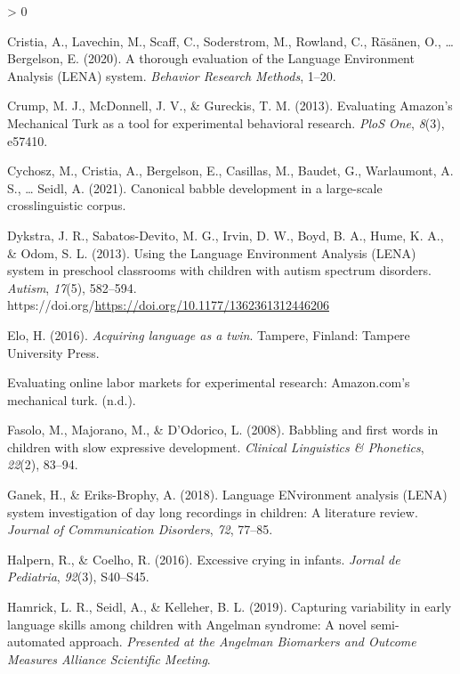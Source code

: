 \documentclass[
  english,
  ,man]{apa6}
\newlength{\cslhangindent}
\newenvironment{CSLReferences}[2] %
 {%
  \setlength{\parindent}{0pt}
  \ifodd #1 \everypar{\setlength{\hangindent}{\cslhangindent}}\ignorespaces\fi
  \ifnum #2 > 0
  \setlength{\parskip}{#2\baselineskip}
  \fi
 }%
 {}
\begin{document}
\begin{CSLReferences}{1}{0}
\leavevmode\hypertarget{ref-cristia2020thorough}{}%
Cristia, A., Lavechin, M., Scaff, C., Soderstrom, M., Rowland, C., Räsänen, O., \ldots{} Bergelson, E. (2020). A thorough evaluation of the {Language Environment Analysis (LENA)} system. \emph{Behavior Research Methods}, 1--20.

\leavevmode\hypertarget{ref-crump2013evaluating}{}%
Crump, M. J., McDonnell, J. V., \& Gureckis, T. M. (2013). Evaluating{ Amazon's Mechanical Turk} as a tool for experimental behavioral research. \emph{PloS One}, \emph{8}(3), e57410.

\leavevmode\hypertarget{ref-cychosz2021canonical}{}%
Cychosz, M., Cristia, A., Bergelson, E., Casillas, M., Baudet, G., Warlaumont, A. S., \ldots{} Seidl, A. (2021). Canonical babble development in a large-scale crosslinguistic corpus.

\leavevmode\hypertarget{ref-Dykstra2013}{}%
Dykstra, J. R., Sabatos-Devito, M. G., Irvin, D. W., Boyd, B. A., Hume, K. A., \& Odom, S. L. (2013). {Using the Language Environment Analysis (LENA) system in preschool classrooms with children with autism spectrum disorders}. \emph{Autism}, \emph{17}(5), 582--594. https://doi.org/\url{https://doi.org/10.1177/1362361312446206}

\leavevmode\hypertarget{ref-Elo}{}%
Elo, H. (2016). \emph{{Acquiring language as a twin}}. Tampere, Finland: Tampere University Press.

\leavevmode\hypertarget{ref-berinsky2012evaluating}{}%
Evaluating online labor markets for experimental research: Amazon.com's mechanical turk. (n.d.).

\leavevmode\hypertarget{ref-fasolo2008babbling}{}%
Fasolo, M., Majorano, M., \& D'Odorico, L. (2008). Babbling and first words in children with slow expressive development. \emph{Clinical Linguistics \& Phonetics}, \emph{22}(2), 83--94.

\leavevmode\hypertarget{ref-ganek2018language}{}%
Ganek, H., \& Eriks-Brophy, A. (2018). {Language ENvironment analysis (LENA)} system investigation of day long recordings in children: A literature review. \emph{Journal of Communication Disorders}, \emph{72}, 77--85.

\leavevmode\hypertarget{ref-halpern2016excessive}{}%
Halpern, R., \& Coelho, R. (2016). Excessive crying in infants. \emph{Jornal de Pediatria}, \emph{92}(3), S40--S45.

\leavevmode\hypertarget{ref-hamrick2019capturing}{}%
Hamrick, L. R., Seidl, A., \& Kelleher, B. L. (2019). Capturing variability in early language skills among children with {A}ngelman syndrome: A novel semi-automated approach. \emph{Presented at the Angelman Biomarkers and Outcome Measures Alliance Scientific Meeting}.


\end{CSLReferences}
\end{document}
